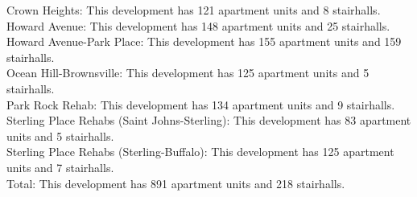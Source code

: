 {Crown Heights}: This development has 121 apartment units and 8 stairhalls.\\{Howard Avenue}: This development has 148 apartment units and 25 stairhalls.\\{Howard Avenue-Park Place}: This development has 155 apartment units and 159 stairhalls.\\{Ocean Hill-Brownsville}: This development has 125 apartment units and 5 stairhalls.\\{Park Rock Rehab}: This development has 134 apartment units and 9 stairhalls.\\{Sterling Place Rehabs (Saint Johns-Sterling)}: This development has 83 apartment units and 5 stairhalls.\\{Sterling Place Rehabs (Sterling-Buffalo)}: This development has 125 apartment units and 7 stairhalls.\\{Total}: This development has 891 apartment units and 218 stairhalls.\\